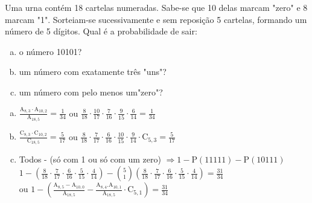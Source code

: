 \begin{ex}
 Uma urna contém 18 cartelas numeradas. Sabe-se que 10 delas marcam "zero" e 8 marcam "1". Sorteiam-se sucessivamente e sem reposição 5 cartelas, formando um número de 5 dígitos. Qual é a probabilidade de sair:
    \begin{enumerate}[(a)]
    \item o número 10101?
    \item um número com exatamente três "uns"?
    \item um número com pelo menos um"zero"?
    \end{enumerate}
      \begin{sol}
          \phantom{A} 
       \begin{enumerate} [(a)]
           \item $\frac{\mathrm{A}_{8,3}\cdot\mathrm{A}_{{10},2}}{\mathrm{A}_{{18},5}} =  \frac{1}{34}$ \hspace{0.2cm}  ou \hspace{0.2 cm} $\frac{8}{18}\cdot\frac{10}{17}\cdot\frac{7}{16}\cdot\frac{9}{15}\cdot\frac{6}{14}= \frac{1}{34}$
           \item $\frac{\mathrm{C}_{8,3}\cdot\mathrm{C}_{{10},2}}{\mathrm{C}_{{18},5}}=\frac{5}{17}$\hspace{0.2cm} ou \hspace{0.2cm} $\frac{8}{18}\cdot\frac{7}{17}\cdot\frac{6}{16}\cdot\frac{10}{15}\cdot\frac{9}{14}\cdot\mathrm{C}_{5,3} = \frac{5}{17}$
           \item Todos - (só com 1 ou só com um zero) $\Longrightarrow 1-\mathrm{P}(11111)-\mathrm{P}(10111)$\\
           $1-(\frac{8}{18}\cdot\frac{7}{17}\cdot\frac{6}{16}\cdot\frac{5}{15}\cdot\frac{4}{14})-\binom{5}{1}(\frac{8}{18}\cdot\frac{7}{17}\cdot\frac{6}{16}\cdot\frac{5}{15}\cdot\frac{4}{14})=\frac{31}{34}$\\
           ou \hspace{0.2cm}
           $1-(\frac{\mathrm{A}_{8,5}-\mathrm{A}_{{10},0}}{\mathrm{A}_{{18},5}}-\frac{\mathrm{A}_{8,4}.\mathrm{A}_{{10},1}}{\mathrm{A}_{{18},5}}\cdot \mathrm{C}_{5,1})=\frac{31}{34}$
       \end{enumerate}
      \end{sol}
\end{ex}